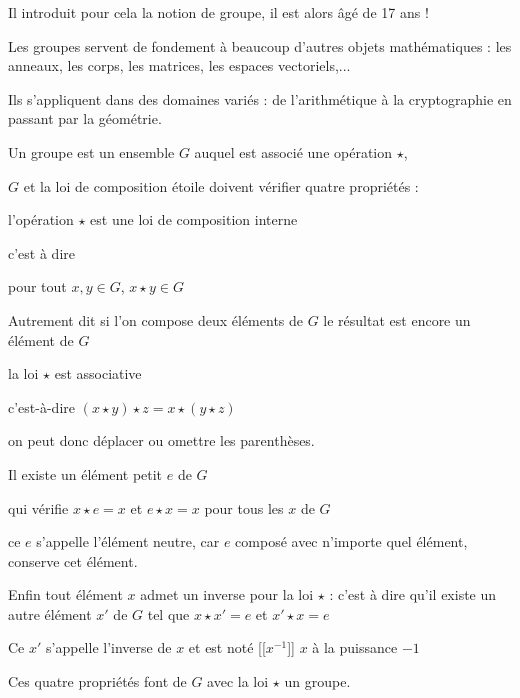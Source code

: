 \change

Il introduit pour cela la notion de groupe, il est alors âgé de 17 ans !

\change

Les groupes servent de fondement à beaucoup d'autres objets mathématiques :
les anneaux, les corps, les matrices, les espaces vectoriels,...

\change

Ils s'appliquent dans des domaines variés : de l'arithmétique à la cryptographie 
en passant par la géométrie.



\diapo

Un groupe est un ensemble $G$ auquel est associé une opération $\star$,

$G$ et la loi de composition étoile doivent vérifier quatre propriétés :

\change

l'opération $\star$ est une loi de composition interne

c'est à dire 

 pour tout $x,y \in G$, \quad $x \star y \in G$ 

Autrement dit si l'on compose deux éléments de $G$ le résultat est encore
un élément de $G$

\change


la loi $\star$  est associative


c'est-à-dire  $(x \star y) \star z = x \star (y \star z)$ 

on peut donc déplacer ou omettre les parenthèses.

\change

Il existe un élément petit $e$ de $G$

qui vérifie $x \star e = x$ et $e \star x = x$ pour tous les $x$ de $G$


ce $e$ s'appelle l'élément neutre,
car $e$ composé avec n'importe quel élément, conserve cet élément.


\change

Enfin tout élément $x$ admet un inverse pour la loi $\star$ :
c'est à dire qu'il existe un autre élément $x'$ de $G$
tel que $x \star x' =e$ et $x' \star x = e$ 

Ce $x'$ s'appelle l'inverse de $x$ et est noté [[$x^{-1}$]] $x$ à la puissance $-1$


Ces quatre propriétés font de $G$ avec la loi $\star$ un groupe.

\change

